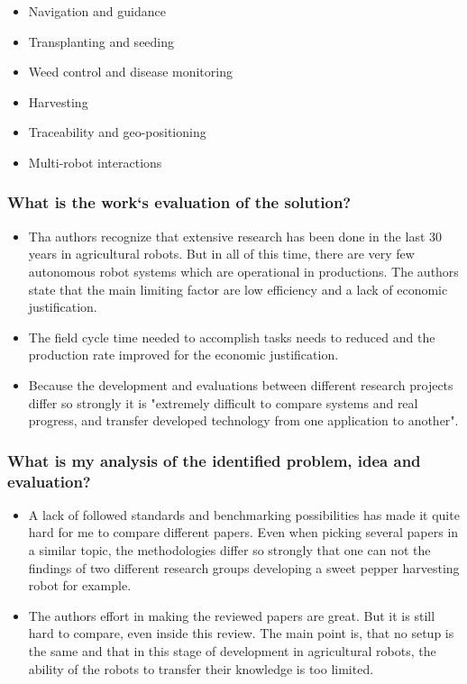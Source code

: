\begin{itemize}
\begin{itemize}
            \item Navigation and guidance
            \item Transplanting and seeding
            \item Weed control and disease monitoring
            \item Harvesting
            \item Traceability and geo-positioning 
            \item Multi-robot interactions
        \end{itemize}
    \end{itemize}
    \subsubsection*{What is the work`s evaluation of the solution?}
    \begin{itemize}
        \item Tha authors recognize that extensive research has been done in the last 30 years in agricultural robots. But in all of this time, there are very few autonomous robot systems which are operational in productions. The authors state that the main limiting factor are low efficiency and a lack of economic justification.
        \item The field cycle time needed to accomplish tasks needs to reduced and the production rate improved for the economic justification.
        \item Because the development and evaluations between different research projects differ so strongly it is "extremely difficult to compare systems and real progress, and transfer developed technology from one application to another".
    \end{itemize}
    \subsubsection*{What is my analysis of the identified problem, idea and evaluation?}
    \begin{itemize}
        \item A lack of followed standards and benchmarking possibilities has made it quite hard for me to compare different papers. Even when picking several papers in a similar topic, the methodologies differ so strongly that one can not the findings of two different research groups developing a sweet pepper harvesting robot for example.
        \item The authors effort in making the reviewed papers are great. But it is still hard to compare, even inside this review. The main point is, that no setup is the same and that in this stage of development in agricultural robots, the ability of the robots to transfer their knowledge is too limited. 
    \end{itemize}
